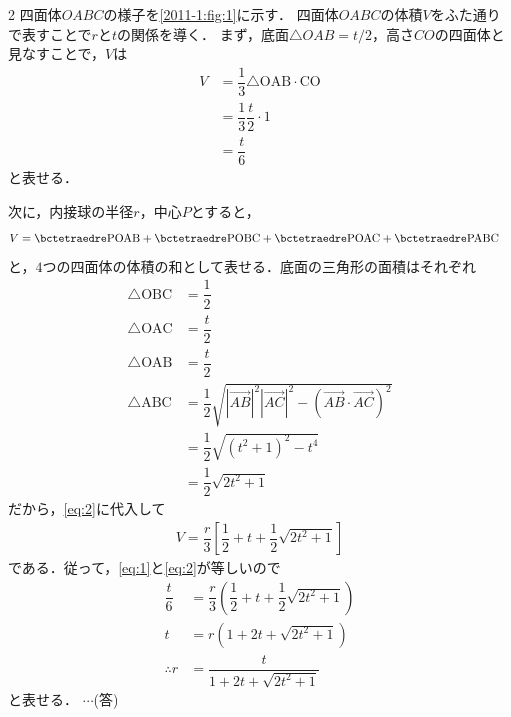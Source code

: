 \documentclass[../../main.tex]{subfiles}
\begin{document}
\begin{multicols}{2}
  四面体$OABC$の様子を\cref{2011-1:fig:1}に示す．
  四面体$OABC$の体積$V$をふた通りで表すことで$r$と$t$の関係を導く．
  まず，底面$\triangle OAB=t/2$，高さ$CO$の四面体と見なすことで，$V$は
  \begin{align}
    V
    & = \dfrac{1}{3} \triangle \mathrm{OAB}\cdot \mathrm{CO} \nonumber \\
    & = \dfrac{1}{3} \dfrac{t}{2} \cdot 1 \nonumber                     \\
    & = \dfrac{t}{6} \label{eq:1}
  \end{align}
  と表せる．

  次に，内接球の半径$r$，中心$P$とすると，
  \begin{align}
    V
    & = \bctetraedre \mathrm{POAB} + \bctetraedre \mathrm{POBC}
    + \bctetraedre \mathrm{POAC} +  \bctetraedre \mathrm{PABC} \label{eq:2}
  \end{align}
  と，$4$つの四面体の体積の和として表せる．底面の三角形の面積はそれぞれ
  \begin{align}
    \triangle \mathrm{OBC} & = \dfrac{1}{2} \\
    \triangle \mathrm{OAC} & = \dfrac{t}{2} \\
    \triangle \mathrm{OAB} & = \dfrac{t}{2} \\
    \triangle \mathrm{ABC} & = \dfrac{1}{2}\sqrt{|\overrightarrow{AB}|^2|\overrightarrow{AC}|^2-(\overrightarrow{AB}\cdot\overrightarrow{AC})^2} \\
    & = \dfrac{1}{2}\sqrt{(t^2+1)^2-t^4} \\
    & = \dfrac{1}{2}\sqrt{2t^2+1}
  \end{align}
  だから，\cref{eq:2}に代入して
  \begin{align}
    V = \dfrac{r}{3}\left[\dfrac{1}{2}+t+\dfrac{1}{2}\sqrt{2t^2+1}\right]\label{eq:3}
  \end{align}
  である．従って，\cref{eq:1}と\cref{eq:2}が等しいので
  \begin{align}
    \dfrac{t}{6}  & = \dfrac{r}{3} \left( \dfrac{1}{2} + t + \dfrac{1}{2} \sqrt{2t^2+1} \right) \\
    t            & = r (1 + 2t + \sqrt{2t^2+1})                                             \\
    \therefore r & = \dfrac{t}{1+2t+\sqrt{2t^2+1}}
  \end{align}
  と表せる．  $\cdots$(答)


\end{multicols}
\end{document}
